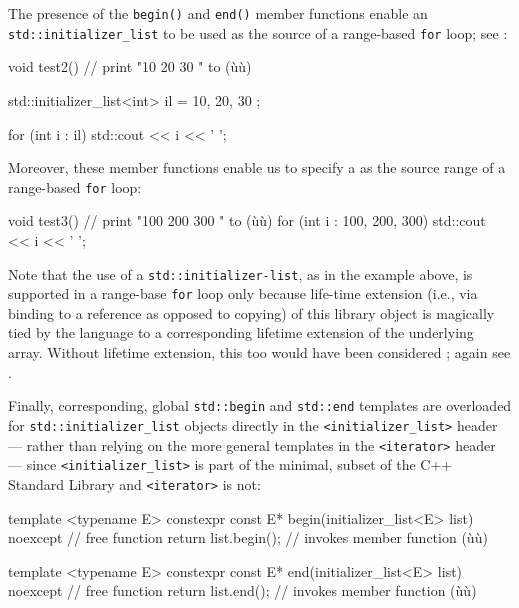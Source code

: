 The presence of the \lstinline!begin()! and \lstinline!end()! member functions
enable an \lstinline!std::initializer_list! to be used as the source of a
range-based \lstinline!for! loop; see :

\begin{emcppslisting}
void test2()  // print "10 20 30 " to (ù{}ù)
{
    std::initializer_list<int> il = { 10, 20, 30 };

    for (int i : il)
    {
        std::cout << i << ' ';
    }
}
\end{emcppslisting}
    

\noindent Moreover, these member functions enable us to specify a
 as the source range of a range-based
\lstinline!for! loop:

\begin{emcppslisting}
void test3()  // print "100 200 300 " to (ù{}ù)
{
    for (int i : {100, 200, 300})
    {
        std::cout << i << ' ';
    }
}
\end{emcppslisting}
    

\noindent Note that the use of a 
\lstinline!std::initializer-list!, as in the example above, is supported in
a range-base \lstinline!for! loop only because life-time extension (i.e.,
via binding to a reference as opposed to copying) of this library object
is magically tied by the language to a corresponding lifetime extension
of the underlying array. Without lifetime extension, this too would have
been considered ; again see .

Finally, corresponding, global \lstinline!std::begin! and \lstinline!std::end!
 templates are overloaded for
\lstinline!std::initializer_list! objects directly in the
\lstinline!<initializer_list>! header --- rather than relying on the more
general templates in the \lstinline!<iterator>! header --- since
\lstinline!<initializer_list>! is part of the minimal,
 subset of the C++ Standard Library and
\lstinline!<iterator>! is not:

\begin{emcppslisting}
template <typename E>
constexpr const E* begin(initializer_list<E> list) noexcept    // free function
{
    return list.begin();  // invokes member function (ù{}ù)
}

template <typename E>
constexpr const E* end(initializer_list<E> list) noexcept      // free function
{
    return list.end();  // invokes member function (ù{}ù)
}
\end{emcppslisting}
    

